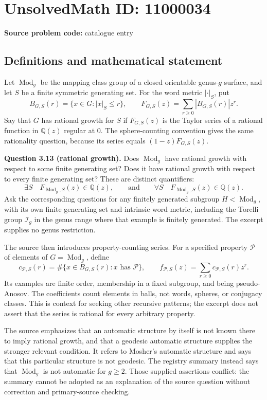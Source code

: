 \documentclass[11pt]{article}
\newcommand{\Q}{\mathbb{Q}}
\begin{document}
\section*{UnsolvedMath ID: 11000034}
\textbf{Source problem code:} catalogue entry
\subsection{Definitions and mathematical statement}
Let $\operatorname{Mod}_g$ be the mapping class group of a closed orientable genus-$g$ surface, and let $S$ be a finite symmetric generating set. For the word metric $|\cdot|_S$, put
\[
 B_{G,S}(r)=\{x\in G:|x|_S\le r\},\qquad
 F_{G,S}(z)=\sum_{r\ge0}|B_{G,S}(r)|z^r.
\]
Say that $G$ has rational growth for $S$ if $F_{G,S}(z)$ is the Taylor series of a rational function in $\Q(z)$ regular at $0$. The sphere-counting convention gives the same rationality question, because its series equals $(1-z)F_{G,S}(z)$.

\textbf{Question 3.13 (rational growth).} Does $\operatorname{Mod}_g$ have rational growth with respect to some finite generating set? Does it have rational growth with respect to every finite generating set? These are distinct quantifiers:
\[
 \exists S\quad F_{\operatorname{Mod}_g,S}(z)\in\Q(z),
 \qquad\text{and}\qquad
 \forall S\quad F_{\operatorname{Mod}_g,S}(z)\in\Q(z).
\]
Ask the corresponding questions for any finitely generated subgroup $H<\operatorname{Mod}_g$, with its own finite generating set and intrinsic word metric, including the Torelli group $\mathcal I_g$ in the genus range where that example is finitely generated. The excerpt supplies no genus restriction.

The source then introduces property-counting series. For a specified property $\mathcal P$ of elements of $G=\operatorname{Mod}_g$, define
\[
 c_{\mathcal P,S}(r)=\#\{x\in B_{G,S}(r):x\text{ has }\mathcal P\},\qquad
 f_{\mathcal P,S}(z)=\sum_{r\ge0}c_{\mathcal P,S}(r)z^r.
\]
Its examples are finite order, membership in a fixed subgroup, and being pseudo-Anosov. The coefficients count elements in balls, not words, spheres, or conjugacy classes. This is context for seeking other recursive patterns; the excerpt does not assert that the series is rational for every arbitrary property.

The source emphasizes that an automatic structure by itself is not known there to imply rational growth, and that a geodesic automatic structure supplies the stronger relevant condition. It refers to Mosher's automatic structure and says that this particular structure is not geodesic. The registry summary instead says that $\operatorname{Mod}_g$ is not automatic for $g\ge2$. Those supplied assertions conflict: the summary cannot be adopted as an explanation of the source question without correction and primary-source checking.
\end{document}
